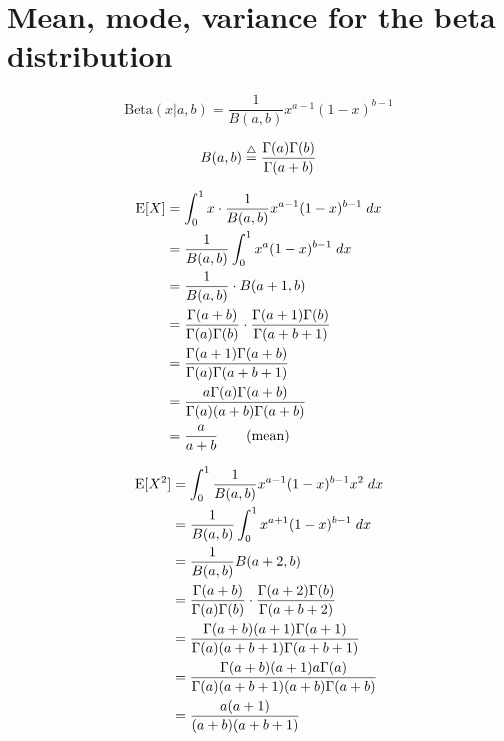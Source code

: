 \documentclass{article}
\begin{document}
\section{Mean, mode, variance for the beta distribution}
\setcounter{equation}{0}
\begin{equation}
  \label{eq:16-1}
  \text{Beta}(x|a,b) = \frac{1}{B(a,b)}x^{a-1}(1-x)^{b-1}  
\end{equation}

\begin{equation}
  \label{eq:16-2}
  B(a,b) \defeq \frac{\Gamma(a) \Gamma(b)}{\Gamma(a+b)}
\end{equation}

\begin{align*}
  \mathrm{E}[X] &= \int_0^1 x \cdot \frac{1}{B(a,b)} x^{a-1} (1-x)^{b-1} \; dx
  \\
       &= \frac{1}{B(a,b)} \int_0^1 x^a (1-x)^{b-1} \; dx \\
       &= \frac{1}{B(a,b)} \cdot B(a+1,b) \\
       &= \frac{\Gamma(a+b)}{\Gamma(a)\Gamma(b)} \cdot
         \frac{\Gamma(a+1)\Gamma(b)}{\Gamma(a+b+1)} \\
       &= \frac{\Gamma(a+1)\Gamma(a+b)}{\Gamma(a)\Gamma(a+b+1)} \\
       &= \frac{a\Gamma(a) \Gamma(a+b)}{\Gamma(a) (a+b) \Gamma(a+b)} \\
       &= \frac{a}{a+b} \qquad \text{(mean)}
\end{align*}

\begin{align*}
  \mathrm{E}[X^2] &= \int_0^1 \frac{1}{B(a,b)} x^{a-1} (1-x)^{b-1} x^2 \; dx \\
         &= \frac{1}{B(a,b)} \int_0^1 x^{a+1} (1-x)^{b-1} \; dx \\
         &= \frac{1}{B(a,b)} B(a+2,b) \\
         &= \frac{\Gamma(a+b)}{\Gamma(a)\Gamma(b)} \cdot
           \frac{\Gamma(a+2)\Gamma(b)}{\Gamma(a+b+2)} \\
         &=
           \frac{\Gamma(a+b)(a+1)\Gamma(a+1)}{\Gamma(a)(a+b+1)\Gamma(a+b+1)}
  \\
         &=
           \frac{\Gamma(a+b)(a+1)a\Gamma(a)}{\Gamma(a)(a+b+1)(a+b)\Gamma(a+b)}
  \\
  &= \frac{a(a+1)}{(a+b)(a+b+1)} \\
\end{align*}
\end{document}
